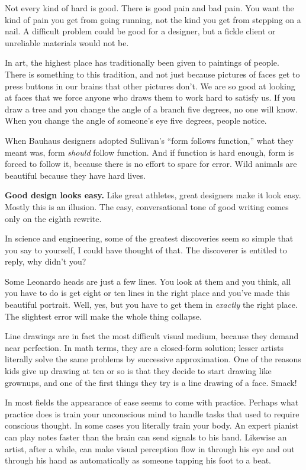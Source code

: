\documentclass[12pt]{book}
\begin{document}
Not every kind of hard is good. There is good pain and bad pain. You
want the kind of pain you get from going running, not the kind you get
from stepping on a nail. A difficult problem could be good for a
designer, but a fickle client or unreliable materials would not be.

In art, the highest place has traditionally been given to paintings of
people. There is something to this tradition, and not just because
pictures of faces get to press buttons in our brains that other pictures
don't. We are so good at looking at faces that we force anyone who draws
them to work hard to satisfy us. If you draw a tree and you change the
angle of a branch five degrees, no one will know. When you change the
angle of someone's eye five degrees, people notice.

When Bauhaus designers adopted Sullivan's ``form follows function,''
what they meant was, form \emph{should} follow function. And if function
is hard enough, form is forced to follow it, because there is no effort
to spare for error. Wild animals are beautiful because they have hard
lives.

\textbf{Good design looks easy.} Like great athletes, great designers
make it look easy. Mostly this is an illusion. The easy, conversational
tone of good writing comes only on the eighth rewrite.

In science and engineering, some of the greatest discoveries seem so
simple that you say to yourself, I could have thought of that. The
discoverer is entitled to reply, why didn't you?

Some Leonardo heads are just a few lines. You look at them and you
think, all you have to do is get eight or ten lines in the right place
and you've made this beautiful portrait. Well, yes, but you have to get
them in \emph{exactly} the right place. The slightest error will make
the whole thing collapse.

Line drawings are in fact the most difficult visual medium, because they
demand near perfection. In math terms, they are a closed-form solution;
lesser artists literally solve the same problems by successive
approximation. One of the reasons kids give up drawing at ten or so is
that they decide to start drawing like grownups, and one of the first
things they try is a line drawing of a face. Smack!

In most fields the appearance of ease seems to come with practice.
Perhaps what practice does is train your unconscious mind to handle
tasks that used to require conscious thought. In some cases you
literally train your body. An expert pianist can play notes faster than
the brain can send signals to his hand. Likewise an artist, after a
while, can make visual perception flow in through his eye and out
through his hand as automatically as someone tapping his foot to a beat.
\end{document}
